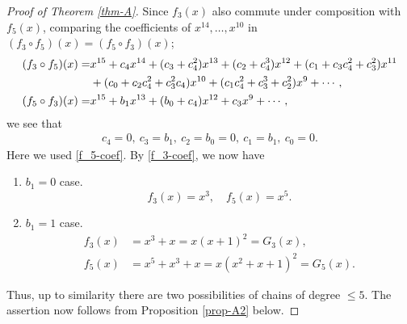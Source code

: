 \documentclass[10pt,a4paper]{amsart}
\begin{document}
\begin{proof}[Proof of Theorem \ref{thm-A}]
Since $f_3(x)$ also commute under composition with $f_5(x)$, comparing the coefficients of $x^{14}, 
\dots, x^{10}$ in $(f_3\circ f_5)(x)=(f_5\circ f_3)(x)$;
\begin{align}\label{f_3-f_5}
(f_3\circ f_5)(x)
=&x^{15}
+c_4x^{14}
+(c_3+c_4^2)x^{13}
+(c_2+c_4^3)x^{12}
+(c_1+c_3c_4^2+c_3^2)x^{11}\\\notag
&+(c_0+c_2c_4^2+c_3^2c_4)x^{10}
+(c_1c_4^2+c_3^3+c_2^2)x^9%
+\cdots ,\\\notag
(f_5\circ f_3)(x)
=&x^{15}
+b_1x^{13}
+(b_0+c_4)x^{12}
+c_3x^9+\cdots ,
\end{align}
we see that
\begin{align}\label{b-c}
c_4=0,\ c_3=b_1,\ c_2=b_0=0,\ c_1=b_1,\ c_0=0.
\end{align}
Here we used \eqref{f_5-coef}.
By \eqref{f_3-coef}, we now have
\begin{enumerate}
\item 
$b_1=0$ case.
\[
f_3(x)=x^3,\quad f_5(x)=x^5.
\]
\item
$b_1=1$ case.
\begin{align*}
    f_3(x)&=x^3+x=x(x+1)^2=G_3(x),\\ f_5(x)&=x^5+x^3+x=x(x^2+x+1)^2=G_5(x).
\end{align*}

\end{enumerate}
Thus, up to similarity there are two possibilities of chains of degree $\leq 5$.
The assertion now follows from Proposition \ref{prop-A2} below.
\end{proof}
\end{document}
